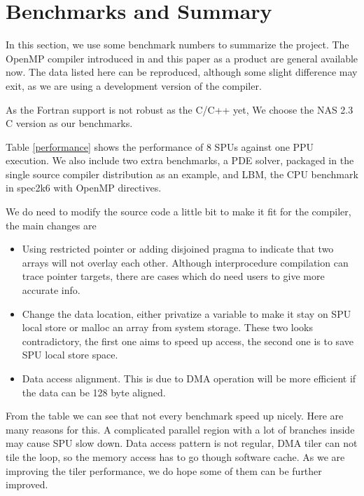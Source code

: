 \section{Benchmarks and Summary}

In this section, we use some benchmark numbers to summarize the project. The
OpenMP compiler introduced in \cite{Br07} and this paper as a product are
general available now. The data listed here can be reproduced, although some
slight difference may exit, as we are using a development version of the
compiler.

As the Fortran support is not robust as the C/C++ yet, We choose the NAS 2.3 C
version as our benchmarks.

Table \ref{performance} shows the performance of 8 SPUs against one PPU
execution. We also include two extra benchmarks, a PDE solver, packaged in the
single source compiler distribution as an example, and LBM, the CPU benchmark
in spec2k6 with OpenMP directives.

We do need to modify the source code a little bit to make it fit for the
compiler, the main changes are

\begin{itemize} 

  \item Using restricted pointer or adding disjoined pragma to indicate that
    two arrays will not overlay each other. Although interprocedure compilation
    can trace pointer targets, there are cases which do need users to give more
    accurate info.
  
  \item Change the data location, either privatize a variable to make it stay
    on SPU local store or malloc an array from system storage. These two looks
    contradictory, the first one aims to speed up access, the second one is to
    save SPU local store space.

  \item Data access alignment. This is due to DMA operation will be more
    efficient if the data can be 128 byte aligned.

\end{itemize}

From the table we can see that not every benchmark speed up nicely. Here are
many reasons for this. A complicated parallel region with a lot of branches
inside may cause SPU slow down. Data access pattern is not regular, DMA tiler
can not tile the loop, so the memory access has to go though software cache. As
we are improving the tiler performance, we do hope some of them can be further
improved.

